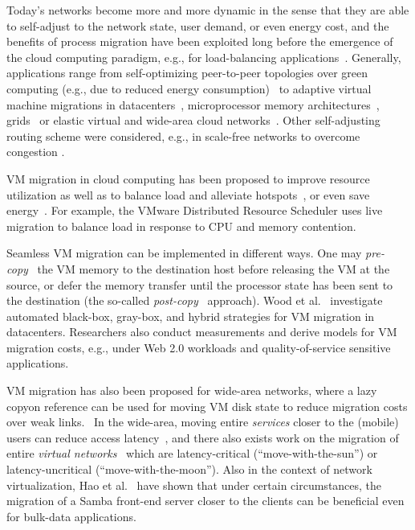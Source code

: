 \documentclass[conference]{IEEEtran}
\begin{document}
Today's networks become more and more dynamic in the sense that they are able to self-adjust to the network state, user demand,
or even energy cost, and the benefits of process migration have been exploited long before
the emergence of the cloud computing paradigm, e.g., for load-balancing
applications~\cite{migration-early}. Generally, applications range from
self-optimizing peer-to-peer topologies over green computing (e.g.,
due to reduced energy consumption)~\cite{elastictree} to
adaptive virtual machine migrations in
datacenters~\cite{Shang2010Energy-aware}, microprocessor memory
architectures~\cite{lis2011brief}, grids~\cite{batista2007self} or elastic virtual and wide-area cloud networks~\cite{ucc12mip}.
Other self-adjusting routing scheme were considered, e.g., in
scale-free networks to overcome congestion \cite{PhysRevE.80.026114}.

VM migration in cloud computing has been proposed to improve resource utilization as well as to balance load
and alleviate hotspots~\cite{seffi-vm-migration}, or even save energy~\cite{elastictree}. For example, the VMware Distributed
Resource Scheduler uses live migration to balance load in
response to CPU and memory contention.

Seamless VM migration can be implemented in different ways.
One may \emph{pre-copy}~\cite{ref3} the
VM memory to the destination host before releasing
the VM at the source,  or defer the memory transfer until the processor state has been sent
to the destination (the so-called \emph{post-copy}~\cite{ref9} approach).
Wood et al.~\cite{sandpiper} investigate automated black-box, gray-box, and hybrid strategies for VM
migration in datacenters.
Researchers also conduct measurements and derive models for VM migration costs, e.g., under Web 2.0 workloads and quality-of-service sensitive applications.~\cite{mess}

VM migration has also been proposed for wide-area networks, where a lazy copyon
reference can be used for moving VM disk state to reduce migration costs over weak links.~\cite{wood-wan}
In the wide-area, moving entire \emph{services} closer to the (mobile) users can reduce access latency~\cite{migton}, and there
 also exists work on the migration of entire \emph{virtual networks}~\cite{ucc12mip} which are latency-critical (``move-with-the-sun'')
 or latency-uncritical (``move-with-the-moon''). Also in the context of network virtualization,
Hao et al.~\cite{cloud-netvirt} have shown that under certain circumstances,
the migration
of a Samba front-end server closer to the clients can be beneficial
even for bulk-data applications.
\end{document}
